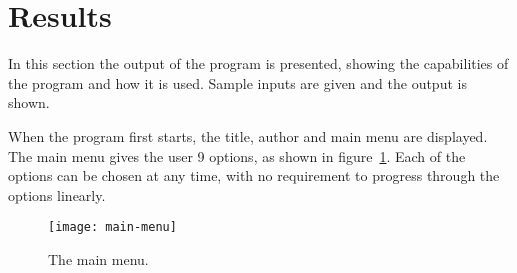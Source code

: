 

\section{Results}
\label{sec:results}
In this section the output of the program is presented, showing the capabilities of the program and how it is used. Sample inputs are given and the output is shown.

When the program first starts, the title, author and main menu are displayed. The main menu gives the user 9 options, as shown in figure~\ref{fig:menu}. Each of the options can be chosen at any time, with no requirement to progress through the options linearly.
\begin{figure}[h!]
  \begin{center}
    \texttt{[image: main-menu]}
  \end{center}
  \caption{The main menu.}
  \label{fig:menu}
\end{figure}



